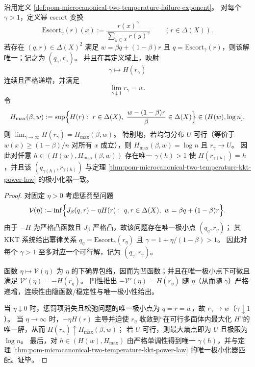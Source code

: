 \begin{proposition}[幂律轨道的存在唯一性与熵的严格单调性]\label{prop:pom-microcanonical-two-temperature-escort-orbit-entropy-monotone}
沿用定义 \ref{def:pom-microcanonical-two-temperature-failure-exponent}。
对每个 \(\gamma>1\)，定义幂 escort 变换
\[
\mathrm{Escort}_\gamma(r)(x):=\frac{r(x)^\gamma}{\sum_{y\in X}r(y)^\gamma}\qquad(r\in\Delta(X)).
\]
若存在 \((q,r)\in\Delta(X)^2\) 满足 \(w=\beta q+(1-\beta)r\) 且 \(q=\mathrm{Escort}_\gamma(r)\)，则该解唯一；记之为 \((q_\gamma,r_\gamma)\)。
并且在其定义域上，映射
\[
\gamma\longmapsto H(r_\gamma)
\]
连续且严格递增，并满足
\[
\lim_{\gamma\downarrow 1}r_\gamma=w.
\]
令
\[
H_{\max}(\beta,w):=\sup\Bigl\{H(r):\ r\in\Delta(X),\ \frac{w-(1-\beta)r}{\beta}\in\Delta(X)\Bigr\}\in(H(w),\log n],
\]
则 \(\lim_{\gamma\to\infty}H(r_\gamma)=H_{\max}(\beta,w)\)。
特别地，若均匀分布 \(U\) 可行（等价于 \(w(x)\ge (1-\beta)/n\) 对所有 \(x\) 成立），则 \(H_{\max}(\beta,w)=\log n\) 且 \(r_\gamma\to U\)。
因此对任意 \(h\in(H(w),H_{\max}(\beta,w))\) 存在唯一 \(\gamma(h)>1\) 使 \(H(r_{\gamma(h)})=h\)，并且该 \((q_{\gamma(h)},r_{\gamma(h)})\) 与定理 \ref{thm:pom-microcanonical-two-temperature-kkt-power-law} 的极小化器一致。
\end{proposition}
\begin{proof}
对固定 \(\eta>0\) 考虑惩罚型问题
\[
\mathcal{V}(\eta):=\inf\Bigl\{J_\beta(q,r)-\eta H(r):\ q,r\in\Delta(X),\ w=\beta q+(1-\beta)r\Bigr\}.
\]
由于 \(-H\) 为严格凸函数且 \(J_\beta\) 严格凸，故该问题存在唯一极小点 \((q_\eta,r_\eta)\)；
其 KKT 系统给出幂律关系 \(q_\eta=\mathrm{Escort}_\gamma(r_\eta)\) 且 \(\gamma=1+\eta/(1-\beta)>1\)。
因此对每个 \(\gamma>1\) 至多对应一个可行解，记为 \((q_\gamma,r_\gamma)\)。
\par
函数 \(\eta\mapsto \mathcal{V}(\eta)\) 为 \(\eta\) 的下确界包络，因而为凹函数；并且在唯一极小点下可微且满足
\(
\mathcal{V}'(\eta)=-H(r_\eta)
\)。
凹性推出 \(-\mathcal{V}'(\eta)=H(r_\eta)\) 随 \(\eta\)（从而随 \(\gamma\)）严格递增，连续性由隐函数/稳定性与唯一极小性给出。
\par
当 \(\eta\downarrow 0\) 时，惩罚项消失且松弛问题的唯一极小点为 \(q=r=w\)，故 \(r_\gamma\to w\)（\(\gamma\downarrow 1\)）。
当 \(\eta\to\infty\) 时，\(-\eta H(r)\) 主导并迫使 \(r_\eta\) 收敛到“在可行多面体内最大化 \(H\)”的唯一解，从而 \(H(r_\gamma)\uparrow H_{\max}(\beta,w)\)；
若 \(U\) 可行，则最大熵点即为 \(U\) 且极限为 \(\log n\)。
最后，对 \(h\in(H(w),H_{\max})\) 由严格单调性得到唯一 \(\gamma(h)\)，并与定理 \ref{thm:pom-microcanonical-two-temperature-kkt-power-law} 的唯一极小化器匹配。证毕。
\end{proof}

